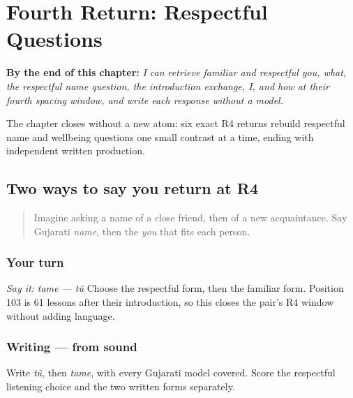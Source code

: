 
\chapter{Fourth Return: Respectful Questions}
\label{ch:gu-r4-respectful-questions}

\begin{chapteropening}
\textbf{By the end of this chapter:} \emph{I can retrieve familiar and respectful you, what, the respectful name question, the introduction exchange, I, and how at their fourth spacing window, and write each response without a model.}

The chapter closes without a new atom: six exact R4 returns rebuild respectful name and wellbeing questions one small contrast at a time, ending with independent written production.
\end{chapteropening}

\section[Practice]{Two ways to say you return at R4}

\label{lesson:GU-R17-you-r4}



\begin{quote}
Imagine asking a name of a close friend, then of a new acquaintance. Say Gujarati \emph{name}, then the \emph{you} that fits each person.
\end{quote}

\subsection*{Your turn}
\emph{Say it:} \emph{tame — tũ} Choose the respectful form, then the familiar form. Position 103 is 61 lessons after their introduction, so this closes the pair's R4 window without adding language.

\subsection*{Writing — from sound}
Write \emph{tũ}, then \emph{tame}, with every Gujarati model covered. Score the respectful listening choice and the two written forms separately.

